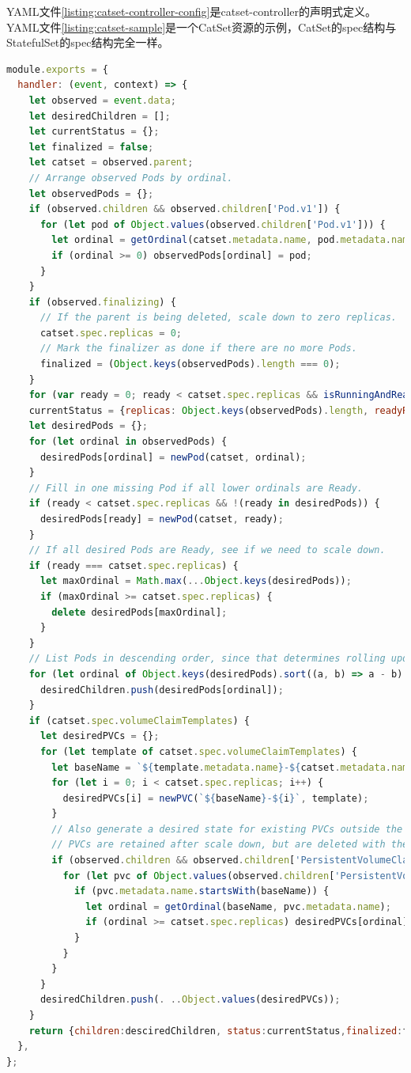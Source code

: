 \documentclass[macfonts,master]{njuthesis}
\begin{document}
YAML文件\ref{listing:catset-controller-config}是catset-controller的声明式定义。YAML文件\ref{listing:catset-sample}是一个CatSet资源的示例，CatSet的spec结构与StatefulSet的spec结构完全一样。

\begin{lstlisting}[language=JavaScript,caption=生成Pod和PVC,label=listing:catset]
module.exports = {
  handler: (event, context) => {
    let observed = event.data;
    let desiredChildren = [];
    let currentStatus = {};
    let finalized = false;
    let catset = observed.parent;
    // Arrange observed Pods by ordinal.
    let observedPods = {};
    if (observed.children && observed.children['Pod.v1']) {
      for (let pod of Object.values(observed.children['Pod.v1'])) {
        let ordinal = getOrdinal(catset.metadata.name, pod.metadata.name);
        if (ordinal >= 0) observedPods[ordinal] = pod;
      }
    }
    if (observed.finalizing) {
      // If the parent is being deleted, scale down to zero replicas.
      catset.spec.replicas = 0;
      // Mark the finalizer as done if there are no more Pods.
      finalized = (Object.keys(observedPods).length === 0);
    }
    for (var ready = 0; ready < catset.spec.replicas && isRunningAndReady(observedPods[ready]); ready++) ;
    currentStatus = {replicas: Object.keys(observedPods).length, readyReplicas: ready};
    let desiredPods = {};
    for (let ordinal in observedPods) {
      desiredPods[ordinal] = newPod(catset, ordinal);
    }
    // Fill in one missing Pod if all lower ordinals are Ready.
    if (ready < catset.spec.replicas && !(ready in desiredPods)) {
      desiredPods[ready] = newPod(catset, ready);
    }
    // If all desired Pods are Ready, see if we need to scale down.
    if (ready === catset.spec.replicas) {
      let maxOrdinal = Math.max(...Object.keys(desiredPods));
      if (maxOrdinal >= catset.spec.replicas) {
        delete desiredPods[maxOrdinal];
      }
    }
    // List Pods in descending order, since that determines rolling update order.
    for (let ordinal of Object.keys(desiredPods).sort((a, b) => a - b).reverse()) {
      desiredChildren.push(desiredPods[ordinal]);
    }
    if (catset.spec.volumeClaimTemplates) {
      let desiredPVCs = {};
      for (let template of catset.spec.volumeClaimTemplates) {
        let baseName = `${template.metadata.name}-${catset.metadata.name}`;
        for (let i = 0; i < catset.spec.replicas; i++) {
          desiredPVCs[i] = newPVC(`${baseName}-${i}`, template);
        }
        // Also generate a desired state for existing PVCs outside the range.
        // PVCs are retained after scale down, but are deleted with the CatSet.
        if (observed.children && observed.children['PersistentVolumeClaim.v1']) {
          for (let pvc of Object.values(observed.children['PersistentVolumeClaim.v1'])) {
            if (pvc.metadata.name.startsWith(baseName)) {
              let ordinal = getOrdinal(baseName, pvc.metadata.name);
              if (ordinal >= catset.spec.replicas) desiredPVCs[ordinal] = newPVC(pvc.metadata.name, template);
            }
          }
        }
      }
      desiredChildren.push(. ..Object.values(desiredPVCs));
    }
    return {children:desciredChildren, status:currentStatus,finalized:finalized};
  },
};
\end{lstlisting}
\end{document}
